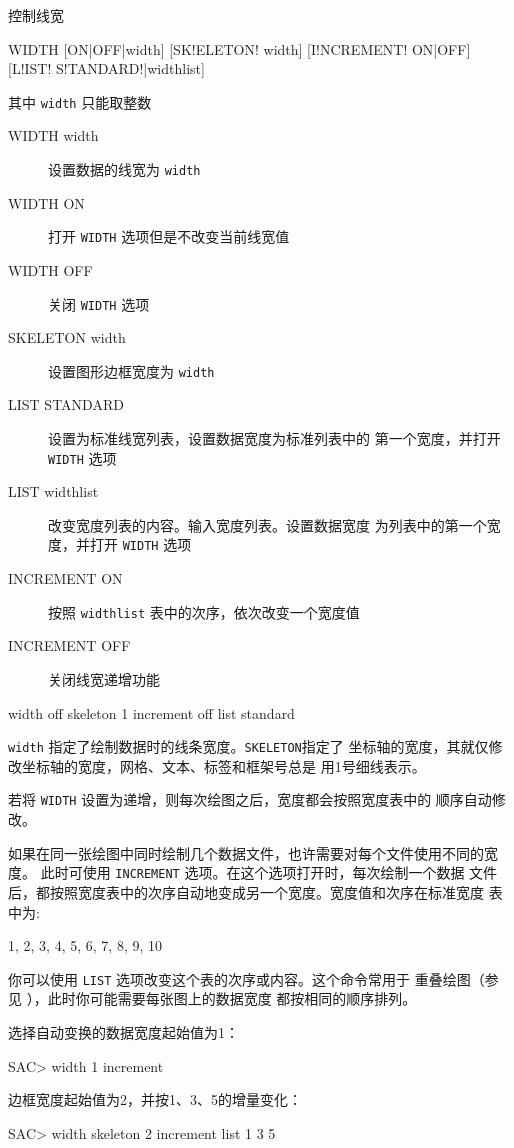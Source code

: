 \label{cmd:width}

控制线宽

\begin{SACSTX}
WIDTH [ON|OFF|width] [SK!ELETON! width] [I!NCREMENT! ON|OFF]
    [L!IST! S!TANDARD!|widthlist]
\end{SACSTX}
其中 \texttt{width} 只能取整数

\begin{description}
\item [WIDTH width] 设置数据的线宽为 \texttt{width}
\item [WIDTH ON] 打开 \texttt{WIDTH} 选项但是不改变当前线宽值
\item [WIDTH OFF] 关闭 \texttt{WIDTH} 选项
\item [SKELETON width] 设置图形边框宽度为 \texttt{width}
\item [LIST STANDARD] 设置为标准线宽列表，设置数据宽度为标准列表中的
    第一个宽度，并打开 \texttt{WIDTH} 选项
\item [LIST widthlist] 改变宽度列表的内容。输入宽度列表。设置数据宽度
    为列表中的第一个宽度，并打开 \texttt{WIDTH} 选项
\item [INCREMENT ON] 按照 \texttt{widthlist} 表中的次序，依次改变一个宽度值
\item [INCREMENT OFF] 关闭线宽递增功能
\end{description}

\begin{SACDFT}
width off skeleton 1 increment off list standard
\end{SACDFT}

\texttt{width} 指定了绘制数据时的线条宽度。\texttt{SKELETON}指定了
坐标轴的宽度，其就仅修改坐标轴的宽度，网格、文本、标签和框架号总是
用1号细线表示。

若将 \texttt{WIDTH} 设置为递增，则每次绘图之后，宽度都会按照宽度表中的
顺序自动修改。

如果在同一张绘图中同时绘制几个数据文件，也许需要对每个文件使用不同的宽度。
此时可使用 \texttt{INCREMENT} 选项。在这个选项打开时，每次绘制一个数据
文件后，都按照宽度表中的次序自动地变成另一个宽度。宽度值和次序在标准宽度
表中为:
\begin{SACCode}
1, 2, 3, 4, 5, 6, 7, 8, 9, 10
\end{SACCode}
你可以使用 \texttt{LIST} 选项改变这个表的次序或内容。这个命令常用于
重叠绘图（参见 ），此时你可能需要每张图上的数据宽度
都按相同的顺序排列。

选择自动变换的数据宽度起始值为1：
\begin{SACCode}
SAC> width 1 increment
\end{SACCode}

边框宽度起始值为2，并按1、3、5的增量变化：
\begin{SACCode}
SAC> width skeleton 2 increment list 1 3 5
\end{SACCode}
